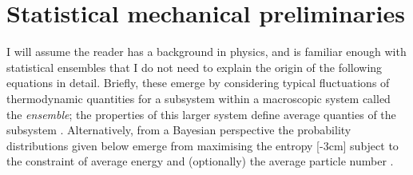 \section{Statistical mechanical preliminaries}

I will assume the reader has a background in physics, and is familiar enough with statistical ensembles that I do not need to explain the origin of the following equations in detail.
Briefly, these emerge by considering typical fluctuations of thermodynamic quantities for a subsystem within a macroscopic system called the \emph{ensemble}; the properties of this larger system define average quanties of the subsystem \cite{standard-text}.
Alternatively, from a Bayesian perspective the probability distributions given below emerge from maximising the entropy%
[-3cm]
subject to the constraint of average energy and (optionally) the average particle number \cite{Jaynes1957a,Jaynes1957b}.

